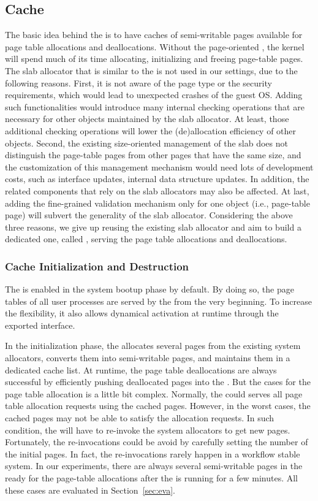 \subsection{\name Cache}\label{sec:cache}
The basic idea behind the \cache is to have caches of semi-writable pages available for page table allocations and deallocations.
Without the page-oriented \cache, the kernel will spend much of its time allocating, initializing and freeing page-table pages.
The slab allocator that is similar to the \cache is not used in our settings, due to the following reasons.
First, it is not aware of the page type or the security requirements, which would lead to unexpected crashes of the guest OS.
Adding such functionalities would introduce many internal checking operations that are necessary for other objects maintained by the slab allocator.
At least, those additional checking operations will lower the (de)allocation efficiency of other objects.
Second, the existing size-oriented management of the slab does not distinguish the page-table pages from other pages that have the same size, and the customization of this management mechanism would need lots of development costs, such as interface updates, internal data structure updates.
In addition, the related components that rely on the slab allocators may also be affected.
At last, adding the fine-grained validation mechanism only for one object (i.e., page-table page) will subvert the generality of the slab allocator.
Considering the above three reasons, we give up reusing the existing slab allocator and aim to build a dedicated one, called \cache, serving the page table allocations and deallocations.

\subsubsection{\name Cache Initialization and Destruction}
The \cache is enabled in the system bootup phase by default.
By doing so, the page tables of all user processes are served by the \cache from the very beginning.
To increase the flexibility, it also allows dynamical activation at runtime through the exported interface.

In the initialization phase, the \cache allocates several pages from the existing system allocators, converts them into semi-writable pages, and maintains them in a dedicated cache list.
At runtime, the page table deallocations are always successful by efficiently pushing deallocated pages into the \cache.
But the cases for the page table allocation is a little bit complex.
Normally, the \cache could serves all page table allocation requests using the cached pages.
However, in the worst cases, the cached pages may not be able to satisfy the allocation requests.
In such condition, the \cache will have to re-invoke the system allocators to get new pages.
Fortunately, the re-invocations could be avoid by carefully setting the number of the initial pages.
In fact, the re-invocations rarely happen in a workflow stable system.
In our experiments, there are always several  semi-writable pages in the \cache ready for the page-table allocations after the \name is running for a few minutes.
All these cases are evaluated in Section~\ref{sec:eva}.

